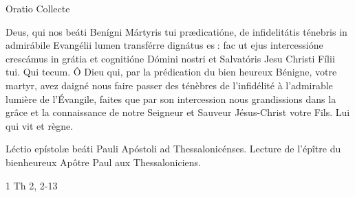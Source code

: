 \begin{paracol}{2}
Oratio
\switchcolumn
Collecte
\switchcolumn*

Deus, qui nos beáti Benígni Mártyris  tui prædicatióne, de infidelitátis ténebris in admirábile Evangélii lumen transférre dignátus es : fac ut ejus intercessióne crescámus in grátia et cognitióne Dómini nostri et Salvatóris Jesu Christi Fílii tui. Qui tecum.
\switchcolumn
Ô Dieu qui, par la prédication du bien heureux Bénigne, votre martyr, avez daigné nous faire passer des ténèbres de l’infidélité à l’admirable lumière de l’Évangile, faites que par son intercession nous grandissions dans la grâce et la connaissance de notre Seigneur et Sauveur Jésus-Christ votre Fils. Lui qui vit et règne.
\switchcolumn*

Léctio epístolæ beáti Pauli Apóstoli ad Thessalonicénses.
\switchcolumn
Lecture de l’épître du bienheureux Apôtre Paul aux Thessaloniciens.
\switchcolumn*

1 Th 2, 2-13
\switchcolumn

\switchcolumn*


\end{paracol}
